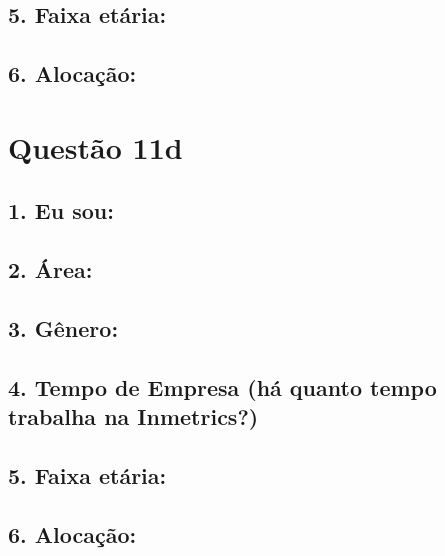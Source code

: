 \documentclass[]{book}
\begin{document}
\hypertarget{faixa-etaria-14}{%
\subsection{5. Faixa etária:}\label{faixa-etaria-14}}

\hypertarget{alocacao-14}{%
\subsection{6. Alocação:}\label{alocacao-14}}

\hypertarget{questao-11d}{%
\section{Questão 11d}\label{questao-11d}}

\hypertarget{eu-sou-15}{%
\subsection{1. Eu sou:}\label{eu-sou-15}}

\hypertarget{area-15}{%
\subsection{2. Área:}\label{area-15}}

\hypertarget{genero-15}{%
\subsection{3. Gênero:}\label{genero-15}}

\hypertarget{tempo-de-empresa-ha-quanto-tempo-trabalha-na-inmetrics-15}{%
\subsection{4. Tempo de Empresa (há quanto tempo trabalha na Inmetrics?)}\label{tempo-de-empresa-ha-quanto-tempo-trabalha-na-inmetrics-15}}

\hypertarget{faixa-etaria-15}{%
\subsection{5. Faixa etária:}\label{faixa-etaria-15}}

\hypertarget{alocacao-15}{%
\subsection{6. Alocação:}\label{alocacao-15}}
\end{document}
